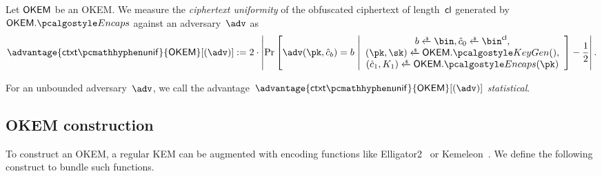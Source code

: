 \begin{definition}
\label{def:ctxt-uniformity}
    Let $\mathsf{OKEM}$ be an OKEM.
    We measure the \emph{ciphertext uniformity} of the obfuscated ciphertext of length~$\mathsf{cl}$ generated by $\OKEM.\encaps$ against an adversary~$\adv$ as
    \[
        \advantage{\ctxtunif}{\OKEM}[(\adv)] := 
        2 \cdot \left|
        \Pr\left[
            \adv(\pk, \hat c_b) = b
        ~\middle|
            \begin{array}{c}
                b \getsr \bin, \hat c_0 \getsr \bin^{\obfctxtlen}, \\
                (\pk,\sk) \getsr \OKEM.\kgen(),\\
                (\hat c_1, K_1) \getsr \OKEM.\encaps(\pk)
            \end{array}
        \right]
        - \frac{1}{2}
        \right|.
    \]
    
    For an unbounded adversary~$\adv$, we call the advantage~$\advantage{\ctxtunif}{\OKEM}[(\adv)] $ \emph{statistical}.
\end{definition}

\subsection{OKEM construction}

To construct an OKEM, a regular KEM can be augmented with encoding functions like \textsf{Elligator2}~\cite{CCS:BHKL13} or \textsf{Kemeleon}~\cite[Sec. 2.4]{CCS:GunSteVei24}. We define the following construct to bundle such functions.


